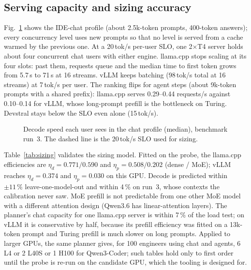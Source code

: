 \documentclass[conference]{IEEEtran}
\begin{document}
\subsection{Serving capacity and sizing accuracy}
Fig.~\ref{fig:serving} shows the IDE-chat profile (about 2.5k-token prompts, 400-token answers); every concurrency
level uses new prompts so that no level is served from a cache warmed by the previous one. At a 20\,tok/s per-user
SLO, one 2$\times$T4 server holds about four concurrent chat users with either engine. llama.cpp stops scaling at
its four slots: past them, requests queue and the median time to first token grows from 5.7\,s to 71\,s at 16
streams. vLLM keeps batching (98\,tok/s total at 16 streams) at 7\,tok/s per user. The ranking flips for agent
steps (about 9k-token prompts with a shared prefix): llama.cpp serves 0.29--0.44 requests/s against 0.10--0.14 for
vLLM, whose long-prompt prefill is the bottleneck on Turing. Devstral stays below the SLO even alone (15\,tok/s).

\begin{figure}[t]
\centering

\caption{Decode speed each user sees in the chat profile (median), benchmark run~3. The dashed line is the
20\,tok/s SLO used for sizing.}
\label{fig:serving}
\end{figure}

Table~\ref{tab:sizing} validates the sizing model. Fitted on the probe, the llama.cpp efficiencies are
$\eta_d = 0.771 / 0.590$ and $\eta_p = 0.508 / 0.202$ (dense / MoE); vLLM reaches $\eta_d = 0.374$ and
$\eta_p = 0.030$ on this GPU. Decode is predicted within $\pm 11\,\%$ leave-one-model-out and within 4\,\% on run~3,
whose contexts the calibration never saw. MoE prefill is not predictable from one other MoE model with a different
attention design (Qwen3.6 has linear-attention layers). The planner's chat capacity for one llama.cpp server is
within 7\,\% of the load test; on vLLM it is conservative by half, because its prefill efficiency was fitted on a
13k-token prompt and Turing prefill is much slower on long prompts. Applied to larger GPUs, the same planner gives,
for 100 engineers using chat and agents, 6 L4 or 2 L40S or 1 H100 for Qwen3-Coder; such tables hold only to first
order until the probe is re-run on the candidate GPU, which the tooling is designed for.
\end{document}
